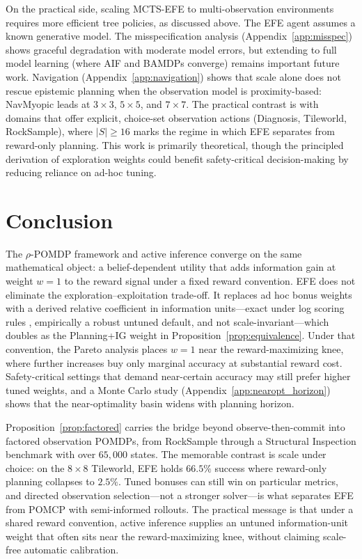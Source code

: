 \documentclass[runningheads]{llncs}
\begin{document}
On the practical side, scaling MCTS-EFE to multi-observation environments requires more efficient tree policies, as discussed above. The EFE agent assumes a known generative model. The misspecification analysis (Appendix~\ref{app:misspec}) shows graceful degradation with moderate model errors, but extending to full model learning (where AIF and BAMDPs converge) remains important future work. Navigation (Appendix~\ref{app:navigation}) shows that scale alone does not rescue epistemic planning when the observation model is proximity-based: NavMyopic leads at $3{\times}3$, $5{\times}5$, and $7{\times}7$. The practical contrast is with domains that offer explicit, choice-set observation actions (Diagnosis, Tileworld, RockSample), where $|S| \geq 16$ marks the regime in which EFE separates from reward-only planning. This work is primarily theoretical, though the principled derivation of exploration weights could benefit safety-critical decision-making by reducing reliance on ad-hoc tuning.

\section{Conclusion}

The $\rho$-POMDP framework and active inference converge on the same mathematical object: a belief-dependent utility that adds information gain at weight $w{=}1$ to the reward signal under a fixed reward convention. EFE does not eliminate the exploration--exploitation trade-off. It replaces ad hoc bonus weights with a derived relative coefficient in information units---exact under log scoring rules \citep{bernardo1979}, empirically a robust untuned default, and not scale-invariant---which doubles as the Planning+IG weight in Proposition~\ref{prop:equivalence}. Under that convention, the Pareto analysis places $w{=}1$ near the reward-maximizing knee, where further increases buy only marginal accuracy at substantial reward cost. Safety-critical settings that demand near-certain accuracy may still prefer higher tuned weights, and a Monte Carlo study (Appendix~\ref{app:nearopt_horizon}) shows that the near-optimality basin widens with planning horizon.

Proposition~\ref{prop:factored} carries the bridge beyond observe-then-commit into factored observation POMDPs, from RockSample through a Structural Inspection benchmark with over $65{,}000$ states. The memorable contrast is scale under choice: on the $8{\times}8$ Tileworld, EFE holds $66.5\%$ success where reward-only planning collapses to $2.5\%$. Tuned bonuses can still win on particular metrics, and directed observation selection---not a stronger solver---is what separates EFE from POMCP with semi-informed rollouts. The practical message is that under a shared reward convention, active inference supplies an untuned information-unit weight that often sits near the reward-maximizing knee, without claiming scale-free automatic calibration.
\end{document}
